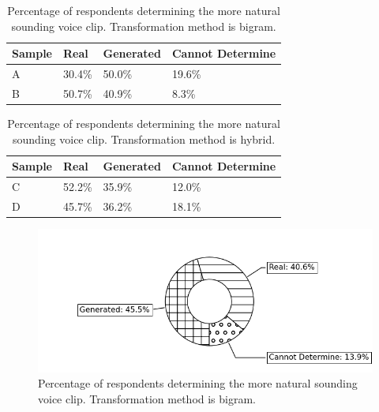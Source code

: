 \documentclass[journal]{IEEEtran}
\begin{document}
\begin{table}
\caption{Percentage of respondents determining the more natural sounding voice clip. Transformation method is bigram.}
\label{tab2}
\small
\setlength{\tabcolsep}{3pt}
\begin{tabular}{|p{58pt}|p{58pt}|p{58pt}|p{58pt}|}
\hline
Sample& 
Real& 
Generated&
Cannot Determine \\
\hline
A & 30.4\% & 50.0\% & 19.6\% \\
B & 50.7\% & 40.9\% & 8.3\% \\ 
\hline
\end{tabular}
\label{tab2}
\end{table}

\begin{table}
\caption{Percentage of respondents determining the more natural sounding voice clip. Transformation method is hybrid.}
\label{tab3}
\small
\setlength{\tabcolsep}{3pt}
\begin{tabular}{|p{58pt}|p{58pt}|p{58pt}|p{58pt}|}
\hline
Sample& 
Real& 
Generated&
Cannot Determine \\
\hline
C & 52.2\% & 35.9\% & 12.0\% \\
D & 45.7\% & 36.2\% & 18.1\% \\ 
\hline
\end{tabular}
\label{tab3}
\end{table}

\begin{figure}
\centerline{\includegraphics[width=\columnwidth]{bigram.png}}
\caption{Percentage of respondents determining the more natural sounding voice clip. Transformation method is bigram.}
\label{fig1}
\end{figure}
\end{document}

